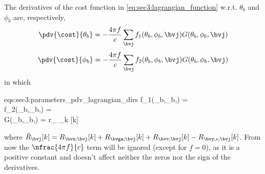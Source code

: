 The derivatives of the cost function in \cref{eq:sec3:lagrangian_function} w.r.t. $\theta_b$ and $\phi_b$ are, respectively,
\begin{equation}
	\label{eq:secA:pdv_lagrangian_theta}
	\pdv{\cost}{\theta_b} = -\frac{4\pi f}{c}\sum_{\bvj} f_1(\theta_b,\phi_b,\bvj) G(\theta_b,\phi_b,\bvj)
\end{equation}
\begin{equation}
	\label{eq:secA:pdv_lagrangian_phi}
	\pdv{\cost}{\phi_b}   = -\frac{4\pi f}{c}\sum_{\bvj} f_2(\theta_b,\phi_b,\bvj) G(\theta_b,\phi_b,\bvj)
\end{equation}
in which
\begin{subgather}{eqs:sec3:parameters_pdv_lagrangian_dirs}
	f_1(\theta_b,\phi_b,\bvj) = \sin{} \cos{} \\
	f_2(\theta_b,\phi_b,\bvj) = \cos{} \sin{} \\
	G(\theta_b,\phi_b,\bvj) = r_{\bvj} \sum_{k}   
\end{subgather}
where $\bar{R}_{\bvj}[k] = R_{\bvx;\bvj}[k] + R_{\bvga;\bvj}[k] + R_{\bvv;\bvj}[k] - R_{\bvy,\epsilon;\bvj}[k]$. From now the $\nfrac{4\pi f}{c}$ term will be ignored (except for $f = 0$), as it is a positive constant and doesn't affect neither the zeros nor the sign of the derivatives.

